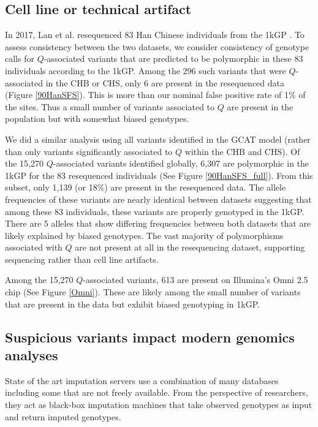 \documentclass[9pt,lineno]{template}
\begin{document}
\subsection{Cell line or technical artifact}

In 2017, Lan et al. resequenced 83 Han Chinese individuals from the 1kGP \citep{Lan2017}. To assess consistency between the two datasets, we consider consistency of genotype calls for $Q$-associated variants that are predicted to be polymorphic in these 83 individuals according to the 1kGP.
Among the 296 such variants that were $Q$-associated in the CHB or CHS, only 6 are present in the resequenced data (Figure \ref{90HanSFS}). 
This is more than our nominal false positive rate of 1\% of the sites. Thus a small number of variants associated to $Q$ are present in the population but with somewhat biased genotypes. 


We did a similar analysis using all variants identified in the GCAT model (rather than only variants significantly associated to $Q$ within the CHB and CHS). 
Of the 15,270 $Q$-associated variants identified globally, 6,307 are polymorphic in the 1kGP for the 83 resequenced individuals  (See Figure \ref{90HanSFS_full}).
From this subset, only 1,139 (or 18\%) are present in the resequenced data.
The allele frequencies of these variants are nearly identical between datasets suggesting that among these 83 individuals, these variants are properly genotyped in the 1kGP.
There are 5 alleles that show differing frequencies between both datasets that are likely explained by biased genotypes.
The vast majority of polymorphisms associated with $Q$ are not present at all in the resequencing dataset, supporting sequencing rather than cell line artifacts.

Among the 15,270 $Q$-associated variants, 613 are present on Illumina's Omni 2.5 chip (See Figure \ref{Omni}). 
These are likely among the small number of variants that are present in the data but exhibit biased genotyping in 1kGP. 

\subsection{Suspicious variants impact modern genomics analyses}

State of the art imputation servers use a combination of many databases including some that are not freely available.
From the perspective of researchers, they act as black-box imputation machines that take observed genotypes as input and return imputed genotypes.  
\end{document}
